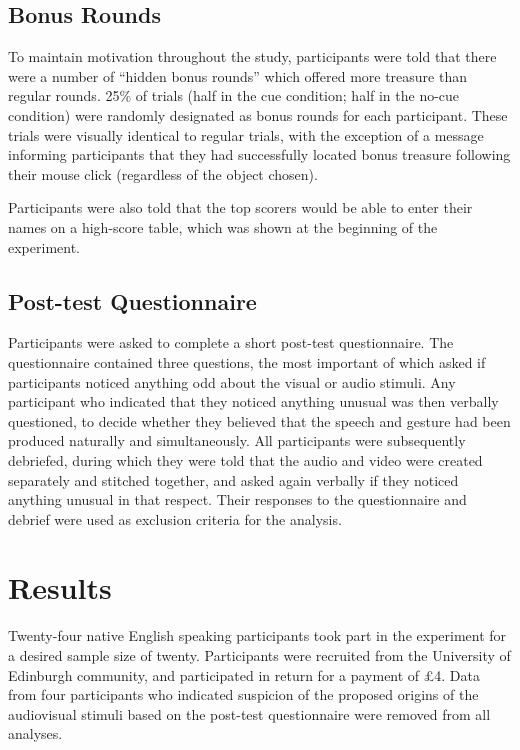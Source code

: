 \documentclass[a4paper,man,natbib]{apa6}
\begin{document}
\subsection{Bonus Rounds}
To maintain motivation throughout the study, participants were told that there were a number of ``hidden bonus rounds'' which offered more treasure than regular rounds.
25\% of trials (half in the cue condition; half in the no-cue condition) were randomly designated as bonus rounds for each participant.
These trials were visually identical to regular trials, with the exception of a message informing participants that they had successfully located bonus treasure following their mouse click (regardless of the object chosen).

Participants were also told that the top scorers would be able to enter their names on a high-score table, which was shown at the beginning of the experiment. 

\subsection{Post-test Questionnaire}
Participants were asked to complete a short post-test questionnaire. 
The questionnaire contained three questions, the most important of which asked if participants noticed anything odd about the visual or audio stimuli.
Any participant who indicated that they noticed anything unusual was then verbally questioned, to decide whether they believed that the speech and gesture had been produced naturally and simultaneously.
All participants were subsequently debriefed, during which they were told that the audio and video were created separately and stitched together, and asked again verbally if they noticed anything unusual in that respect. 
Their responses to the questionnaire and debrief were used as exclusion criteria for the analysis.

\section{Results}
Twenty-four native English speaking participants took part in the experiment for a desired sample size of twenty. %
Participants were recruited from the University of Edinburgh community, and participated in return for a payment of \pounds{}4.
Data from four participants who indicated suspicion of the proposed origins of the audiovisual stimuli based on the post-test questionnaire were removed from all analyses. %
\end{document}
